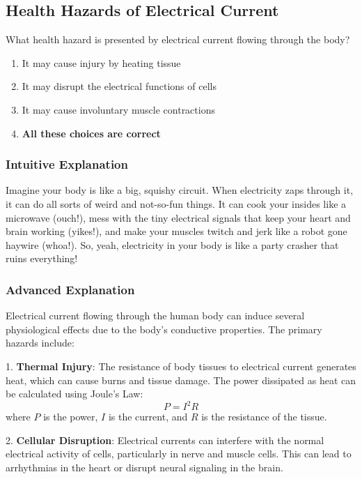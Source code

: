 \subsection{Health Hazards of Electrical Current}
\label{T0A02}

\begin{tcolorbox}[colback=gray!10!white,colframe=black!75!black,title=T0A02]
What health hazard is presented by electrical current flowing through the body?
\begin{enumerate}[label=\Alph*)]
    \item It may cause injury by heating tissue
    \item It may disrupt the electrical functions of cells
    \item It may cause involuntary muscle contractions
    \item \textbf{All these choices are correct}
\end{enumerate}
\end{tcolorbox}

\subsubsection{Intuitive Explanation}
Imagine your body is like a big, squishy circuit. When electricity zaps through it, it can do all sorts of weird and not-so-fun things. It can cook your insides like a microwave (ouch!), mess with the tiny electrical signals that keep your heart and brain working (yikes!), and make your muscles twitch and jerk like a robot gone haywire (whoa!). So, yeah, electricity in your body is like a party crasher that ruins everything!

\subsubsection{Advanced Explanation}
Electrical current flowing through the human body can induce several physiological effects due to the body's conductive properties. The primary hazards include:

1. \textbf{Thermal Injury}: The resistance of body tissues to electrical current generates heat, which can cause burns and tissue damage. The power dissipated as heat can be calculated using Joule's Law:
   \[
   P = I^2 R
   \]
   where \( P \) is the power, \( I \) is the current, and \( R \) is the resistance of the tissue.

2. \textbf{Cellular Disruption}: Electrical currents can interfere with the normal electrical activity of cells, particularly in nerve and muscle cells. This can lead to arrhythmias in the heart or disrupt neural signaling in the brain.

